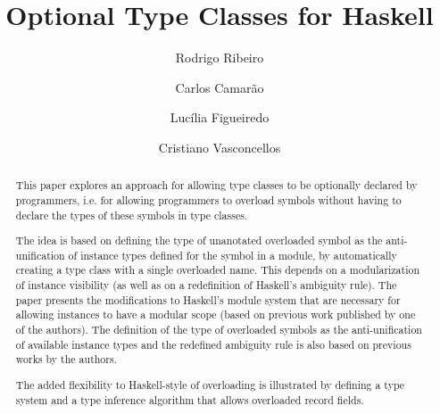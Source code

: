 \documentclass{llncs}
\begin{document}
%



%
\mainmatter              %

\title{Optional Type Classes for Haskell}

%
\author{Rodrigo Ribeiro  \and Carlos Camar\~ao \and Luc\'ilia
Figueiredo \and Cristiano Vasconcellos}
\maketitle              %

\begin{abstract}

This paper explores an approach for allowing type classes to be
optionally declared by programmers, i.e. for allowing programmers to
overload symbols without having to declare the types of these symbols
in type classes.

The idea is based on defining the type of unanotated overloaded symbol
as the anti-unification of instance types defined for the symbol in a
module, by automatically creating a type class with a single
overloaded name. This depends on a modularization of instance
visibility (as well as on a redefinition of Haskell's ambiguity rule).
The paper presents the modifications to Haskell's module system that
are necessary for allowing instances to have a modular scope (based on
previous work published by one of the authors). The definition of the
type of overloaded symbols as the anti-unification of available
instance types and the redefined ambiguity rule is also based on
previous works by the authors.

The added flexibility to Haskell-style of overloading is illustrated
by defining a type system and a type inference algorithm that allows
overloaded record fields.


\end{abstract}







% 





% 





\end{document}
